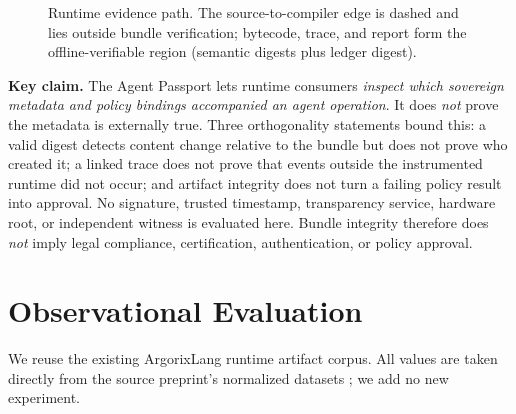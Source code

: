 \documentclass[conference]{IEEEtran}
\newcommand{\code}[1]{\texttt{\small #1}}
\newcommand{\Argorix}{%
\textcolor{argViolet}{A}\textcolor{argViolet}{r}\textcolor{argIndigo}{g}\textcolor{argIndigo}{o}\textcolor{argElectric}{r}\textcolor{argElectric}{i}\textcolor{argElectric}{x}\textcolor{argCyan}{L}\textcolor{argCyan}{a}\textcolor{argCyanBright}{n}\textcolor{argCyanBright}{g}\xspace}
\begin{document}
\begin{figure}[t]
\centering
{}
\caption{Runtime evidence path. The source-to-compiler edge is dashed and lies
outside bundle verification; bytecode, trace, and report form the
offline-verifiable region (semantic digests plus ledger digest).}
\label{fig:evpath}
\end{figure}

\noindent\textbf{Key claim.} The Agent Passport lets runtime consumers
\emph{inspect which sovereign metadata and policy bindings accompanied an agent
operation}. It does \emph{not} prove the metadata is externally true. Three
orthogonality statements bound this: a valid digest detects content change
relative to the bundle but does not prove who created it; a linked trace does not
prove that events outside the instrumented runtime did not occur; and artifact
integrity does not turn a failing policy result into approval. No signature,
trusted timestamp, transparency service, hardware root, or independent witness is
evaluated here. Bundle integrity therefore does \emph{not} imply legal
compliance, certification, authentication, or policy approval.

\section{Observational Evaluation}\label{sec:eval}
We reuse the existing \Argorix runtime artifact corpus. All values are taken
directly from the source preprint's normalized datasets
\cite{venegas2026argorixlang}; we add no new experiment.
\end{document}

